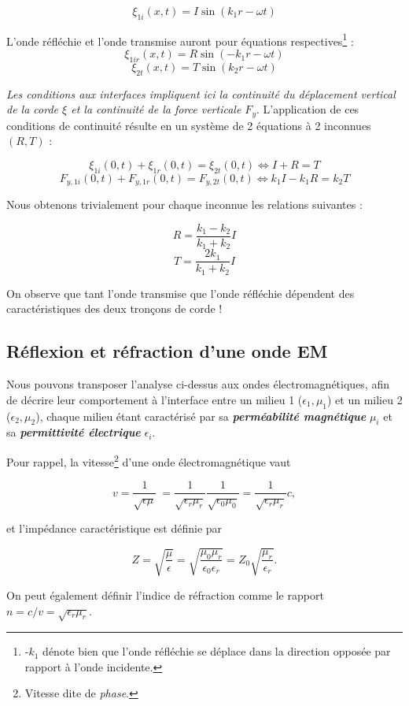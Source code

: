 \[ \xi_{1i}(x,t) = I \sin(k_{1}r - \omega t) \]

L'onde réfléchie et l'onde transmise auront pour équations respectives\footnote{-$k_{1}$ dénote bien que l'onde réfléchie se déplace dans la direction opposée par rapport à l'onde incidente.} : 
\[ \xi_{1ir}(x,t) = R \sin(-k_{1}r - \omega t) \]
\[ \xi_{2t}(x,t) = T \sin(k_{2}r - \omega t) \]

\textit{Les conditions aux interfaces impliquent ici la continuité du déplacement vertical de la corde $\xi$ et la continuité de la force 
verticale $F_y$}.  L'application de ces conditions de continuité résulte en un système de 2 équations à 2 inconnues $(R,T)$ :

\[\xi_{1i}(0,t) + \xi_{1r}(0,t) = \xi_{2t}(0,t) \Leftrightarrow I + R = T\]
\[F_{y,1i}(0,t) + F_{y,1r}(0,t) = F_{y,2t}(0,t) \Leftrightarrow k_{1}I - k_{1}R = k_{2}T\]

Nous obtenons trivialement pour chaque inconnue les relations suivantes : 

\[R = \frac{k_{1} - k_{2}}{k_{1} + k_{2}}I\]
\[T = \frac{2 k_{1}}{k_{1} + k_{2}}I\]

On observe que tant l'onde transmise que l'onde réfléchie dépendent des caractéristiques des deux tronçons de corde !


\subsection{Réflexion et réfraction d'une onde EM} 

Nous pouvons transposer l'analyse ci-dessus aux ondes électromagnétiques, afin de décrire leur comportement à l'interface entre un milieu 1 ($\epsilon_{1}, \mu_{1}$) et un milieu 2 ($\epsilon_{2},\mu_{2}$), chaque milieu étant caractérisé par sa \textit{\textbf{perméabilité magnétique}} $\mu_i$
et sa \textbf{\textit{permittivité électrique}} $\epsilon_i$.

Pour rappel, la vitesse\footnote{Vitesse dite de \textit{phase}.} d'une onde électromagnétique vaut  

\[v = \frac{1}{\sqrt{\epsilon \mu}}\ = \frac{1}{\sqrt{\epsilon_{r} \mu_{r}}} \frac{1}{\sqrt{\epsilon_{0} \mu_{0}}} = \frac{1}{\sqrt{\epsilon_{r} \mu_{r}}} c,  \] 

et l'impédance caractéristique est définie par 

\[Z = \sqrt{\frac{\mu}{\epsilon}} = \sqrt{\frac{\mu_0\mu_r}{\epsilon_0\epsilon_r}} = Z_0 \sqrt{\frac{\mu_r}{\epsilon_r}}.  \]

On peut également définir l'indice de réfraction comme le rapport $n = c/v = \sqrt{\epsilon_{r}\mu_r}$.

